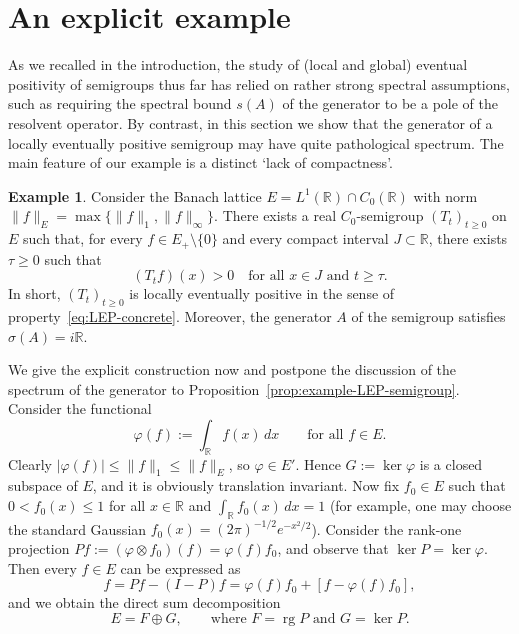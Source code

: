 \documentclass[a4paper, reqno]{amsart}
\numberwithin{equation}{section}
\theoremstyle{plain}
\theoremstyle{definition}
\newtheorem{example}[theorem]{Example}
\theoremstyle{remark}
\DeclareMathOperator{\rg}{rg}
\newcommand{\RR}{\mathbb{R}}
\begin{document}
\section{An explicit example}
\label{sec:example}
As we recalled in the introduction, the study of (local and global) eventual positivity of semigroups thus far has relied on rather strong spectral assumptions, such as requiring the spectral bound $s(A)$ of the generator to be a pole of the resolvent operator. By contrast, in this section we show that the generator of a locally eventually positive semigroup may have quite pathological spectrum. The main feature of our example is a distinct `lack of compactness'.

\begin{example}
	\label{exam:LEP-semigroup}
	Consider the Banach lattice $E = L^1(\RR) \cap C_0(\RR)$ with norm $\|f\|_E = \max\{\|f\|_1, \|f\|_\infty\}$. There exists a real $C_0$-semigroup $(T_t)_{t\ge 0}$ on $E$ such that, for every $f\in E_+\setminus\{0\}$ and every compact interval $J\subset\RR$, there exists $\tau\ge 0$ such that
	\begin{equation*}
		(T_t f)(x)>0 \quad\text{for all } x\in J\text{ and } t\ge\tau.
	\end{equation*}
	In short, $(T_t)_{t\ge 0}$ is locally eventually positive in the sense of property~\eqref{eq:LEP-concrete}. Moreover, the generator $A$ of the semigroup satisfies $\sigma(A)=i\RR$.
		
	We give the explicit construction now and postpone the discussion of the spectrum of the generator to Proposition~\ref{prop:example-LEP-semigroup}. Consider the functional
	\begin{equation*}
		\varphi(f) := \int_\RR f(x) \,dx \qquad \text{for all } f \in E.
	\end{equation*}
	Clearly $|\varphi(f)| \le \|f\|_1 \le \|f\|_E$, so $\varphi \in E'$. Hence $G:=\ker\varphi$ is a closed subspace of $E$, and it is obviously translation invariant. Now fix $f_0 \in E$ such that $0<f_0(x) \le 1$ for all $x \in \RR$ and $\int_\RR f_0(x) \,dx = 1$ (for example, one may choose the standard Gaussian $f_0(x)=(2\pi)^{-1/2}e^{-x^2/2}$). Consider the rank-one projection $Pf := (\varphi\otimes f_0)(f) = \varphi(f)f_0$, and observe that $\ker P =\ker\varphi$. Then every $f \in E$ can be expressed as
	\begin{equation*}
		f = Pf - (I-P)f = \varphi(f)f_0 + [f-\varphi(f)f_0],
	\end{equation*}
	and we obtain the direct sum decomposition
	\begin{equation*}
		E = F\oplus G,\qquad \text{where }F=\rg P\text{ and }G=\ker P.
	\end{equation*}
	

\end{example}
\end{document}

